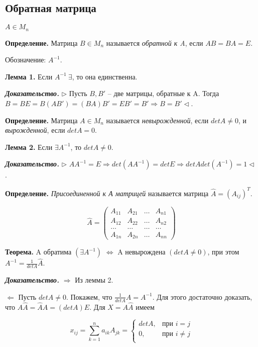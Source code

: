 \bigskip
\subsection{Обратная матрица}

$A \in M_n$

\bigskip
\textbf{Определение.} Матрица $B \in M_n$ называется \textit{обратной к A}, если $AB = BA = E$.

Обозначение: $A^{-1}$.

\bigskip
\textbf{Лемма 1.} Если $A^{-1} \ \exists$, то она единственна.

\bigskip
\textbf{\textit{Доказательство.}} $\rhd$ Пусть $B, B'$ -- две матрицы, обратные к A. Тогда $B = BE = B(AB') = (BA)B' = EB' = B' \Rightarrow B = B' \lhd$.

\bigskip
\textbf{Определение.} Матрица $A \in M_n$ называется \textit{невырожденной}, если $detA \neq 0$, и \textit{вырожденной}, если $detA = 0$.

\bigskip
\textbf{Лемма 2.} Если $\exists A^{-1}$, то $detA \neq 0$.

\bigskip
\textbf{\textit{Доказательство.}} $\rhd$ $AA^{-1} = E \Rightarrow det(AA^{-1}) = detE \Rightarrow detA det(A^{-1}) = 1 \lhd$.

\bigskip
\textbf{Определение.} \textit{Присоединенной к А матрицей} называется матрица $\widehat{A} = (A_{ij})^T$.

\bigskip
\begin{equation*}\widehat{A} = \begin{pmatrix} A_{11} & A_{21} & \dots & A_{n1} \\ A_{12} & A_{22} & \dots & A_{n2} \\ \dots & \dots & \dots & \dots \\ A_{1n} & A_{2n} & \dots & A_{nn} \end{pmatrix}
\end{equation*}

\bigskip
\textbf{Теорема.} A обратима $(\exists A^{-1})$ $\Leftrightarrow$ A невырождена $(detA \neq 0)$, при этом $A^{-1} = \frac{1}{detA} \widehat{A}$.

\bigskip
\textbf{\textit{Доказательство.}} $\Rightarrow$ Из леммы 2.

$\Leftarrow$ Пусть $detA \neq 0$. Покажем, что $\frac{1}{detA} \widehat{A} = A^{-1}$. Для этого достаточно доказать, что $A \widehat{A} = \widehat{A} A = (detA) E$. Для $X = A \widehat{A}$ имеем

\begin{equation*}
	x_{ij} = \sum\limits_{k = 1}^n a_{ik} A_{jk} = \begin{cases}
		detA, &\text{при }  i = j  \\
		0, &\text{при } i \neq j \\
	\end{cases}
\end{equation*}


